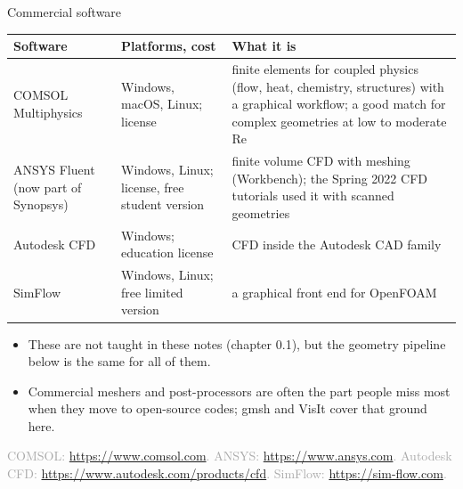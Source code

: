 \documentclass[aspectratio=169,11pt]{beamer}
\newcommand{\sourcecredit}[1]{\vfill\hfill{\tiny\textcolor{DarkGray}{#1}}}
\begin{document}
\begin{frame}{Commercial software}
\scriptsize
\begin{tabular}{@{}L{0.16\textwidth}L{0.19\textwidth}L{0.57\textwidth}@{}}
\toprule
Software & Platforms, cost & What it is\\
\midrule
COMSOL Multiphysics & Windows, macOS, Linux; license & finite elements for coupled physics (flow, heat, chemistry, structures) with a graphical workflow; a good match for complex geometries at low to moderate Re\\
ANSYS Fluent (now part of Synopsys) & Windows, Linux; license, free student version & finite volume CFD with meshing (Workbench); the Spring 2022 CFD tutorials used it with scanned geometries\\
Autodesk CFD & Windows; education license & CFD inside the Autodesk CAD family\\
SimFlow & Windows, Linux; free limited version & a graphical front end for OpenFOAM\\
\bottomrule
\end{tabular}
\vspace{2mm}
\begin{itemize}
  \item These are not taught in these notes (chapter 0.1), but the geometry pipeline below is the same for all of them.
  \item Commercial meshers and post-processors are often the part people miss most when they move to open-source codes; gmsh and VisIt cover that ground here.
\end{itemize}
\sourcecredit{COMSOL: \url{https://www.comsol.com}. ANSYS: \url{https://www.ansys.com}. Autodesk CFD: \url{https://www.autodesk.com/products/cfd}. SimFlow: \url{https://sim-flow.com}.}
\end{frame}
\end{document}
